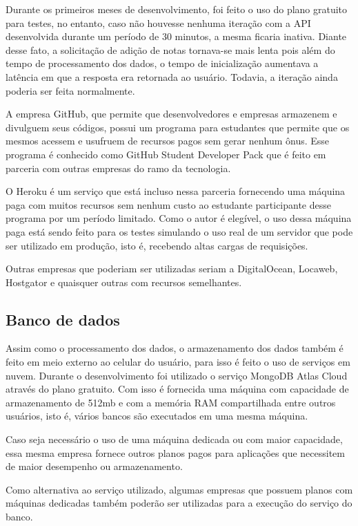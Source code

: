 Durante os primeiros meses de desenvolvimento, foi feito o uso do plano gratuito para testes, no entanto, caso não houvesse nenhuma iteração com a API desenvolvida durante um período de 30 minutos, a mesma ficaria inativa. Diante desse fato, a solicitação de adição de notas tornava-se mais lenta pois além do tempo de processamento dos dados, o tempo de inicialização aumentava a latência em que a resposta era retornada ao usuário. Todavia, a iteração ainda poderia ser feita normalmente.

A empresa GitHub, que permite que desenvolvedores e empresas armazenem e divulguem seus códigos, possui um programa para estudantes que permite que os mesmos acessem e usufruem de recursos pagos sem gerar nenhum ônus. Esse programa é conhecido como GitHub Student Developer Pack\cite{githubStudentPack} que é feito em parceria com outras empresas do ramo da tecnologia.

O Heroku é um serviço que está incluso nessa parceria fornecendo uma máquina paga com muitos recursos sem nenhum custo ao estudante participante desse programa por um período limitado. Como o autor é elegível, o uso dessa máquina paga está sendo feito para os testes simulando o uso real de um servidor que pode ser utilizado em produção, isto é, recebendo altas cargas de requisições.

Outras empresas que poderiam ser utilizadas seriam a DigitalOcean, Locaweb, Hostgator e quaisquer outras com recursos semelhantes.

\subsection{Banco de dados}

Assim como o processamento dos dados, o armazenamento dos dados também é feito em meio externo ao celular do usuário, para isso é feito o uso de serviços em nuvem. Durante o desenvolvimento foi utilizado o serviço MongoDB Atlas Cloud através do plano gratuito. Com isso é fornecida uma máquina com capacidade de armazenamento de 512mb e com a memória RAM compartilhada entre outros usuários, isto é, vários bancos são executados em uma mesma máquina.

Caso seja necessário o uso de uma máquina dedicada ou com maior capacidade, essa mesma empresa fornece outros planos pagos para aplicações que necessitem de maior desempenho ou armazenamento.

Como alternativa ao serviço utilizado, algumas empresas que possuem planos com máquinas dedicadas também poderão ser utilizadas para a execução do serviço do banco.


